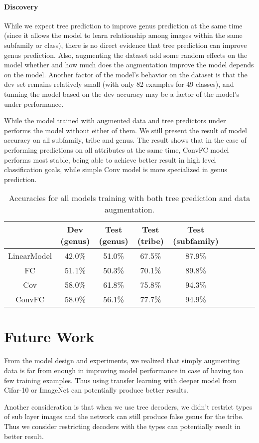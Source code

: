 \documentclass{article}
\begin{document}
\paragraph{Discovery} While we expect tree prediction to improve genus prediction at the same time (since it allows the model to learn relationship among images within the same subfamily or class), there is no direct evidence that tree prediction can improve genus prediction. Also, augmenting the dataset add some random effects on the model whether and how much does the augmentation improve the model depends on the model. Another factor of the model's behavior on the dataset is that the dev set remains relatively small (with only 82 examples for 49 classes), and tunning the model based on the dev accuracy may be a factor of the model's under performance.

While the model trained with augmented data and tree predictors under performs the model without either of them. We still present the result of model accuracy on all subfamily, tribe and genus. The result shows that in the case of performing predictions on all attributes at the same time, ConvFC model performs most stable, being able to achieve better result in high level classification goals, while simple Conv model is more specialized in genus prediction. 

\begin{table}[h]
\centering
\begin{tabular}{ |c|c|c|c|c|c|c|c|c| } 
\hline  
       	    &   Dev (genus) &   Test (genus) & Test (tribe) & Test (subfamily)	\\\hline\hline
LinearModel &  	42.0\%    	&  	51.0\%       &    67.5\%  	&  87.9\% 			\\
FC     		&   51.1\%   	&   50.3\%       &    70.1\%    &  89.8\%			\\
Cov    		&   58.0\%   	&   61.8\%       &    75.8\%   	&  94.3\%			\\
ConvFC 		&   58.0\%   	&   56.1\%       &    77.7\%    &  94.9\%			\\\hline
\end{tabular}
\caption{Accuracies for all models training with both tree prediction and data augmentation. }
\label{t2}
\end{table}

\section{Future Work}

From the model design and experiments, we realized that simply augmenting data is far from enough in improving model performance in case of having too few training examples. Thus using transfer learning with deeper model from Cifar-10 or ImageNet can potentially produce better results. 

Another consideration is that when we use tree decoders, we didn't restrict types of sub layer images and the network can still produce false genus for the tribe. Thus we consider restricting decoders with the types can potentially result in better result.



\end{document}
